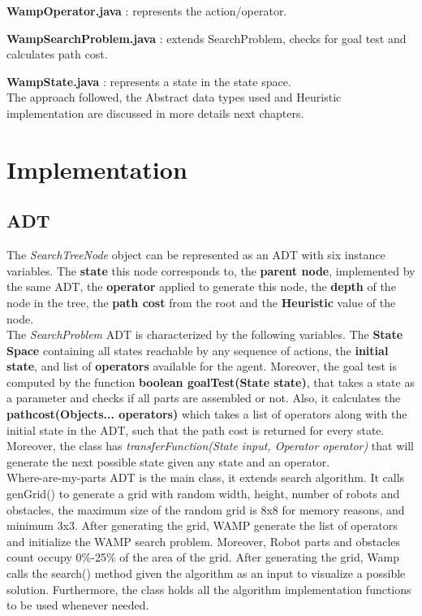 \textbf{WampOperator.java} : represents the action/operator.

\textbf{WampSearchProblem.java} : extends SearchProblem, checks for goal test and calculates path cost.

\textbf{WampState.java} : represents a state in the state space.\\

The approach followed, the Abstract data types used and Heuristic implementation are discussed in more details next chapters.

\chapter{Implementation}


\section{ADT}
The \textit{SearchTreeNode} object can be represented as an ADT with six instance variables. The \textbf{state} this node corresponds to, the \textbf{parent node}, implemented by the same ADT, the \textbf{operator} applied to generate this node, the \textbf{depth} of the node in the tree, the \textbf{path cost} from the root and the \textbf{Heuristic} value of the node.\\

The \textit{SearchProblem} ADT is characterized by the following variables. The \textbf{State Space} containing all states reachable by any sequence of actions, the \textbf{initial state}, and list of \textbf{operators} available for the agent. Moreover, the goal test is computed by the function \textbf{boolean goalTest(State state)}, that takes a state as a parameter and checks if all parts are assembled or not. Also, it calculates the \textbf{pathcost(Objects... operators)} which takes a list of operators along with the initial state in the ADT, such that the path cost is returned for every state. Moreover, the class has \textit{transferFunction(State input, Operator operator)} that will generate the next possible state given any state and an operator.\\

Where-are-my-parts ADT is the main class, it extends search algorithm. It calls genGrid() to generate a grid with random width, height, number of robots and obstacles, the maximum size of the random grid is 8x8 for memory reasons, and minimum 3x3. After generating the grid, WAMP generate the list of operators and initialize the WAMP search problem. Moreover, Robot parts and obstacles count occupy 0\%-25\% of the area of the grid. After generating the grid, Wamp calls the search() method given the algorithm as an input to visualize a possible solution. Furthermore, the class holds all the algorithm implementation functions to be used whenever needed.


